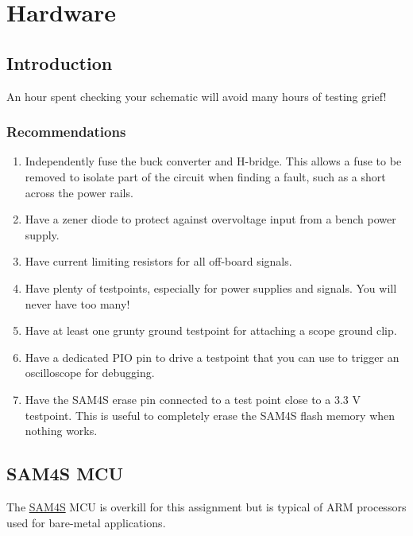 \chapter{Hardware}


\section{Introduction}\label{introduction}

An hour spent checking your schematic will avoid many hours of testing
grief!

\subsection{Recommendations}\label{recommendations}

\begin{enumerate}
\item
  Independently fuse the buck converter and H-bridge. This allows a fuse
  to be removed to isolate part of the circuit when finding a fault,
  such as a short across the power rails.

\item
  Have a zener diode to protect against overvoltage input from a bench
  power supply.

\item
  Have current limiting resistors for all off-board signals.

\item
  Have plenty of testpoints, especially for power supplies and signals.
  You will never have too many!

\item
  Have at least one grunty ground testpoint for attaching a scope ground
  clip.

\item
  Have a dedicated PIO pin to drive a testpoint that you can use to
  trigger an oscilloscope for debugging.

\item
  Have the SAM4S erase pin connected to a test point close to a 3.3 V
  testpoint. This is useful to completely erase the SAM4S flash memory
  when nothing works.
\end{enumerate}

\section{SAM4S MCU}\label{sam4s-mcu}

The \url{SAM4S} MCU is overkill for this assignment but is typical of
ARM processors used for bare-metal applications.


